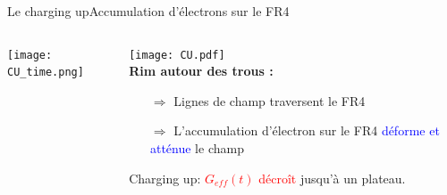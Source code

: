     \begin{frame}{Le charging up}{Accumulation d'électrons sur le FR4}
        \begin{scriptsize}
            \begin{columns}
       			\begin{column}{0.5\textwidth}
           			\texttt{[image: CU\_time.png]}
       			\end{column}\hfill
       			\begin{column}{0.5\textwidth}
       				\texttt{[image: CU.pdf]}\\\vspace{1cm}
           			\textbf{Rim autour des trous :}
       				\begin{itemize}
       					\item[$\Rightarrow$] Lignes de champ traversent le FR4\\
       					\item[$\Rightarrow$] L'accumulation d'électron sur le FR4 \textcolor{blue}{déforme et atténue} le champ
       				\end{itemize}
       				Charging up: \textcolor{red}{$G_{eff}(t)$ décroît} jusqu'à un plateau.
           		\end{column}
           	\end{columns}
        \end{scriptsize}
    \end{frame}
        
